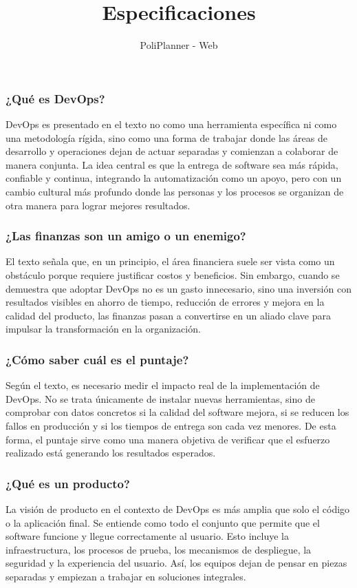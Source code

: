 \documentclass[12pt, a4paper]{article}
\title{\textbf{Especificaciones}}
\author{
    PoliPlanner - Web
}
\date{}
\begin{document}
\maketitle

\subsubsection*{\textbf{¿Qué es DevOps?}}
DevOps es presentado en el texto no como una herramienta específica ni como una metodología rígida, sino como una forma de
trabajar donde las áreas de desarrollo y operaciones dejan de actuar separadas y comienzan a colaborar de manera conjunta. La
idea central es que la entrega de software sea más rápida, confiable y continua, integrando la automatización como un apoyo,
pero con un cambio cultural más profundo donde las personas y los procesos se organizan de otra manera para lograr mejores
resultados.

\subsubsection*{\textbf{¿Las finanzas son un amigo o un enemigo?}}
El texto señala que, en un principio, el área financiera suele ser vista como un obstáculo porque requiere justificar costos
y beneficios. Sin embargo, cuando se demuestra que adoptar DevOps no es un gasto innecesario, sino una inversión con
resultados visibles en ahorro de tiempo, reducción de errores y mejora en la calidad del producto, las finanzas pasan a
convertirse en un aliado clave para impulsar la transformación en la organización.

\subsubsection*{\textbf{¿Cómo saber cuál es el puntaje?}}
Según el texto, es necesario medir el impacto real de la implementación de DevOps. No se trata únicamente de instalar nuevas
herramientas, sino de comprobar con datos concretos si la calidad del software mejora, si se reducen los fallos en producción
y si los tiempos de entrega son cada vez menores. De esta forma, el puntaje sirve como una manera objetiva de verificar que
el esfuerzo realizado está generando los resultados esperados.

\subsubsection*{\textbf{¿Qué es un producto?}}
La visión de producto en el contexto de DevOps es más amplia que solo el código o la aplicación final. Se entiende como todo
el conjunto que permite que el software funcione y llegue correctamente al usuario. Esto incluye la infraestructura, los
procesos de prueba, los mecanismos de despliegue, la seguridad y la experiencia del usuario. Así, los equipos dejan de pensar
en piezas separadas y empiezan a trabajar en soluciones integrales.
\end{document}
